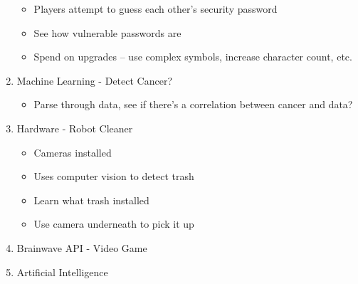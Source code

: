 \documentclass[10pt]{article}
\begin{document}
\begin{enumerate}
    \begin{itemize}
        \item Players attempt to guess each other's security password
        \item See how vulnerable passwords are
        \item Spend on upgrades -- use complex symbols, increase character count, etc.
    \end{itemize}
    \item Machine Learning - Detect Cancer?
    \begin{itemize}
        \item Parse through data, see if there's a correlation between cancer and data?
    \end{itemize}
    \item Hardware - Robot Cleaner
    \begin{itemize}
        \item Cameras installed
        \item Uses computer vision to detect trash
        \item Learn what trash installed
        \item Use camera underneath to pick it up
    \end{itemize}
    \item Brainwave API - Video Game
    \item Artificial Intelligence
\end{enumerate}
\end{document}
